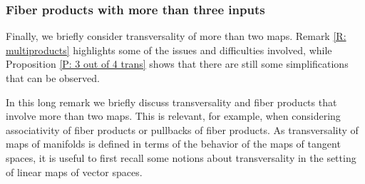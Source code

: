 \subsubsection{Fiber products with more than three inputs}

Finally, we briefly consider transversality of more than two maps. Remark \ref{R: multiproducts} highlights some of the issues and difficulties involved, while Proposition \ref{P: 3 out of 4 trans} shows that there are still some simplifications that can be observed.

\begin{remark}\label{R: multiproducts}
	In this long remark we briefly discuss transversality and fiber products that involve more than two maps.
	This is relevant, for example, when considering associativity of fiber products or pullbacks of fiber products.
	As transversality of maps of manifolds is defined in terms of the behavior of the maps of tangent spaces, it is useful to first recall some notions about transversality in the setting of linear maps of vector spaces.


\end{remark}
